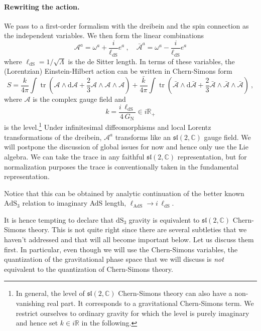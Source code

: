 \documentclass[12pt,a4paper]{article}
\newcommand{\be}{\begin{equation}}
\newcommand{\ee}{\end{equation}}
\DeclareMathOperator\tr{tr}
\renewcommand\sl{\mathfrak{sl}}
\newcommand\CC{\mathbb{C}}
\newcommand\RR{\mathbb{R}}
\renewcommand\d{\text{d}}
\begin{document}
\paragraph{Rewriting the action.} We pass to a first-order formalism with the dreibein and the spin connection as the independent variables. We then form the linear combinations 
\be
\mathcal{A}^a=\omega^a + \frac{i}{\ell_\text{dS}} e^a~,\quad \bar{\mathcal{A}}^a=\omega^a  - \frac{i}{\ell_\text{dS}} e^a \label{eq:SL(2,C) gauge fields}
\ee
where $\ell_\text{dS} = 1/\sqrt{\Lambda}$ is the de Sitter length.
In terms of these variables, the (Lorentzian) Einstein-Hilbert action can be written in Chern-Simons form
\cite{Witten:1988hc}
\be 
S=\frac{k}{4\pi} \int \tr \left(\mathcal{A} \wedge \d \mathcal{A}+\frac{2}{3} \mathcal{A} \wedge \mathcal{A} \wedge \mathcal{A} \right)+\frac{\bar{k}}{4\pi} \int \tr \left(\bar{\mathcal{A}} \wedge \d \bar{\mathcal{A}}+\frac{2}{3} \bar{\mathcal{A}} \wedge \bar{\mathcal{A}} \wedge \bar{\mathcal{A}} \right)~, \label{eq:PSL(2,C) CS action}
\ee
where $\mathcal{A}$ is the complex gauge field and 
\be 
k=\frac{i\, \ell_\text{dS}}{4\, G_\text{N}} \in i \RR_+ \label{eq:level PSL(2,C) CS gravity}
\ee
is the level.\footnote{In general, the level of $\sl(2,\CC)$ Chern-Simons theory can also have a non-vanishing real part. It corresponds to a gravitational Chern-Simons term. 
We restrict ourselves to ordinary gravity for which the level is purely imaginary and hence set $k \in i \RR$ in the following. }
Under infinitesimal diffeomorphisms and local Lorentz transformations of the dreibein, $\mathcal{A}^a$ transforms like an $\mathfrak{sl}(2,\CC)$ gauge field. We will postpone the discussion of global issues for now and hence only use the Lie algebra.
We can take the trace in any faithful $\mathfrak{sl}(2,\CC)$ representation, but for normalization purposes the trace is conventionally taken in the fundamental representation.

Notice that this can be obtained by analytic continuation of the better known $\mathrm{AdS}_3$ relation to imaginary AdS length, $\ell_\text{AdS} \to i \, \ell_\text{dS}$. 

It is hence tempting to declare that $\mathrm{dS}_3$ gravity is equivalent to $\mathfrak{sl}(2,\CC)$ Chern-Simons theory. 
This is not quite right since there are several subtleties that we haven't addressed and that will all become important below. Let us discuss them first. In particular, even though we will use the Chern-Simons variables, the quantization of the gravitational phase space that we will discuss is \emph{not} equivalent to the quantization of Chern-Simons theory.
\end{document}
